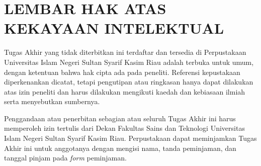 %
%
%
%


\chapter*{LEMBAR HAK ATAS KEKAYAAN INTELEKTUAL}

Tugas Akhir yang tidak diterbitkan ini terdaftar dan tersedia di Perpustakaan Universitas Islam Negeri Sultan Syarif Kasim Riau adalah terbuka untuk umum, dengan ketentuan bahwa hak cipta ada pada peneliti. Referensi kepustakaan diperkenankan dicatat, tetapi pengutipan atau ringkasan hanya dapat dilakukan atas izin peneliti dan harus dilakukan mengikuti kaedah dan kebiasaan ilmiah serta menyebutkan sumbernya.

Penggandaan atau penerbitan sebagian atau seluruh Tugas Akhir ini harus memperoleh izin tertulis dari Dekan Fakultas Sains dan Teknologi Universitas Islam Negeri Sultan Syarif Kasim Riau. Perpustakaan dapat meminjamkan Tugas Akhir ini untuk anggotanya dengan mengisi nama, tanda peminjaman, dan tanggal pinjam pada \emph{form} peminjaman.